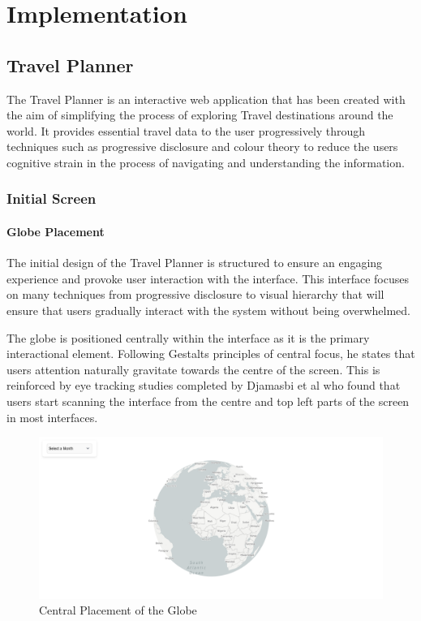 \documentclass[]{project_final}
\begin{document}
\chapter{Implementation}
\section{Travel Planner}
The Travel Planner is an interactive web application that has been created with the aim
of simplifying the process of exploring Travel destinations around the world. It provides
essential travel data to the user progressively through techniques such as progressive disclosure and colour theory to reduce the users cognitive strain in the process of navigating and understanding the information.

\subsection{Initial Screen}
\subsubsection{Globe Placement}
The initial design of the Travel Planner is structured to ensure an engaging experience and provoke user interaction with the interface. This interface focuses on many techniques from progressive disclosure to visual hierarchy that will ensure that users gradually interact with the system without being overwhelmed.

The globe is positioned centrally within the interface as it is the primary interactional element. Following Gestalts principles of central focus, he states that users attention naturally gravitate towards the centre of the screen. This is reinforced by eye tracking studies completed by Djamasbi et al who found that users start scanning the interface from the centre and top left parts of the screen in most interfaces.

\begin{figure}[ht!]
  \centering
  \includegraphics[width=\textwidth]{1.png}
  \caption{Central Placement of the Globe}
  \label{fig:1}
\end{figure}
\end{document}

